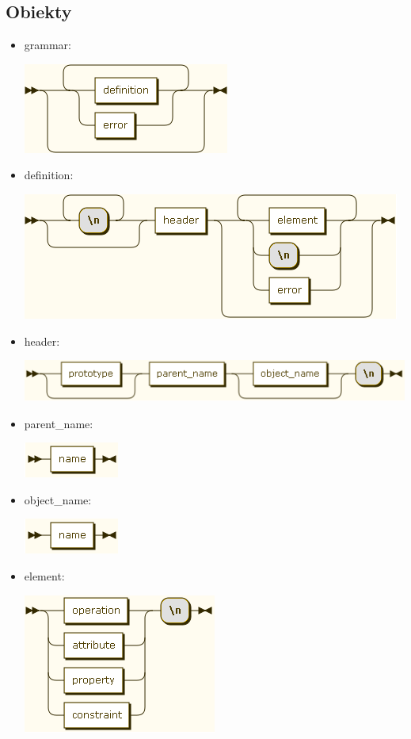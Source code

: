 \subsection{Obiekty}
\begin{itemize}
\item grammar:

\includegraphics[scale=0.66]{images/grammar/grammar.png}

\item definition:

\includegraphics[scale=0.66]{images/grammar/definition.png}

\item header:

\includegraphics[scale=0.66]{images/grammar/header.png}

\item parent\_name:

\includegraphics[scale=0.66]{images/grammar/name_xx.png}

\item object\_name:

\includegraphics[scale=0.66]{images/grammar/name_xx.png}

\item element:

\includegraphics[scale=0.66]{images/grammar/element.png}
\end{itemize}
